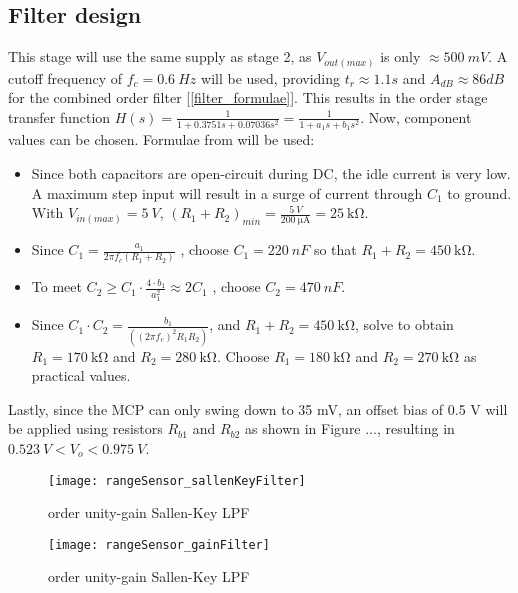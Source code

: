 \subsection{Filter design}{\label{rangeSensor_filterDesign}}

This stage will use the same supply as stage 2, as $V_{out(max)}$ is only $\approx \SI{500}{mV}$.
A cutoff frequency of $f_c = \SI{0.6}{Hz}$ will be used, providing $t_r \approx 1.1 s$ and $A_{dB} \approx 86 dB $ for the combined  order filter [\ref{filter_formulae}].
This results in the  order stage transfer function $H(s) = \frac{1}{1 + 0.3751 s + 0.07036 s^2} = \frac{1}{1 + a_1 s + b_1 s^2}$. Now, component values can be chosen.
Formulae from \cite{filterDesign} will be used:

\begin{itemize}
  \item Since both capacitors are open-circuit during DC, the idle current is very low. A maximum step input will result in a surge of current through $C_1$ to ground.
        With $V_{in(max)} = \SI{5}{V}$, $(R_1 + R_2)_{min} = \frac{\SI{5}{V}}{\SI{200}{\micro\ampere}} = \SI{25}{\kilo\ohm}$.
  \item Since $C_1 = \frac{a_1}{2 \pi f_c (R_1 + R_2)}$ \cite{filterDesign}, choose $C_1 = \SI{220}{nF}$ so that $R_1 + R_2 = \SI{450}{\kilo\ohm}$.
  \item To meet $C_2 \geq C_1 \cdot \frac{4 \cdot b_1}{a_1 ^2} \approx 2 C_1 $ \cite{filterDesign}, choose $C_2 = \SI{470}{nF}$.
  \item Since $C_1 \cdot C_2 = \frac{b_1}{((2 \pi f_c)^2 R_1 R_2)}$, and $R_1 + R_2 = \SI{450}{\kilo\ohm}$, solve to obtain $R_1 = \SI{170}{\kilo\ohm}$ and $R_2 = \SI{280}{\kilo\ohm}$.
        Choose $R_1 = \SI{180}{\kilo\ohm}$ and $R_2 = \SI{270}{\kilo\ohm}$ as practical values.
\end{itemize}

Lastly, since the MCP can only swing down to 35 mV, an offset bias of 0.5 V will be applied using resistors $R_{b1}$ and $R_{b2}$ as shown in Figure ..., resulting in $\SI{0.523}{V} < V_o < \SI{0.975}{V}$.

\begin{figure}[!htb]
  \centering
  \begin{minipage}{.4\textwidth}
    \centering
    \texttt{[image: rangeSensor\_sallenKeyFilter]}
    \caption{ order unity-gain Sallen-Key LPF \cite{filterDesign}}
    \label{fig:sallenKeyFilter}
  \end{minipage}
  \begin{minipage}{.4\textwidth}
    \centering
    \texttt{[image: rangeSensor\_gainFilter]}
    \caption{ order unity-gain Sallen-Key LPF \cite{gainOffset30Seconds}}
    \label{fig:sallenKeyFilter}
  \end{minipage}
\end{figure}

